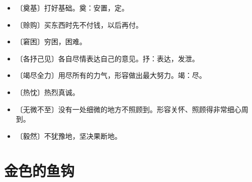 \documentclass[12pt,UTF-8,openany]{ctexbook}
\begin{document}
\begin{itemize}
    \setlength\itemsep{-0.2em}
    \item 〔奠基〕打好基础。奠：安置，定。
    \item 〔赊购〕买东西时先不付钱，以后再付。
    \item 〔窘困〕穷困，困难。
    \item 〔各抒己见〕各自尽情表达自己的意见。抒：表达，发泄。
    \item 〔竭尽全力〕用尽所有的力气，形容做出最大努力。竭：尽。
    \item 〔热忱〕热烈真诚。
    \item 〔无微不至〕没有一处细微的地方不照顾到。形容关怀、照顾得非常细心周到。
    \item 〔毅然〕不犹豫地，坚决果断地。
\end{itemize}

\chapter{金色的鱼钩}
\end{document}
